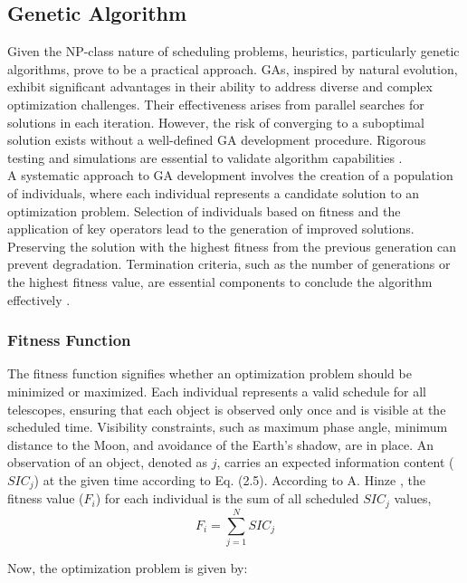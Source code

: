 \subsection{Genetic Algorithm}

Given the NP-class nature of scheduling problems, heuristics, particularly genetic algorithms, prove to be a practical approach. GAs, inspired by natural evolution, exhibit significant advantages in their ability to address diverse and complex optimization challenges. Their effectiveness arises from parallel searches for solutions in each iteration. However, the risk of converging to a suboptimal solution exists without a well-defined GA development procedure. Rigorous testing and simulations are essential to validate algorithm capabilities \cite{nsga,hinze1}.\\

A systematic approach to GA development involves the creation of a population of individuals, where each individual represents a candidate solution to an optimization problem. Selection of individuals based on fitness and the application of key operators lead to the generation of improved solutions. Preserving the solution with the highest fitness from the previous generation can prevent degradation. Termination criteria, such as the number of generations or the highest fitness value, are essential components to conclude the algorithm effectively \cite{hinze1}.\\

\subsubsection{Fitness Function} 

The fitness function signifies whether an optimization problem should be minimized or maximized. Each individual represents a valid schedule for all telescopes, ensuring that each object is observed only once and is visible at the scheduled time. Visibility constraints, such as maximum phase angle, minimum distance to the Moon, and avoidance of the Earth's shadow, are in place. An observation of an object, denoted as $j$, carries an expected information content ($SIC_j$) at the given time according to Eq. (2.5). According to A. Hinze \cite{hinze1}, the fitness value ($F_i$) for each individual is the sum of all scheduled $SIC_j$ values,
\begin{equation}
	F_i=\sum_{j=1}^{N} SIC_j
\end{equation} 

Now, the optimization problem is given by:

